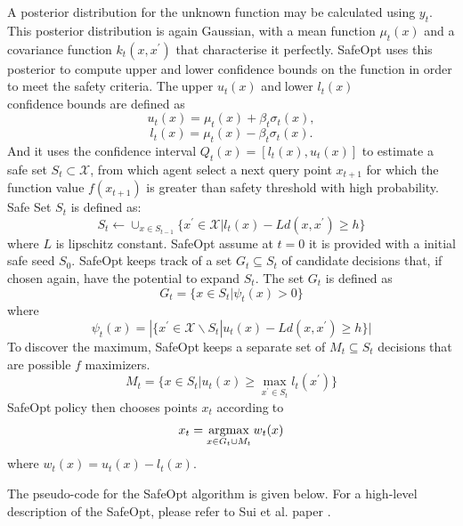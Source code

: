 A posterior distribution for the unknown function may be calculated using $y_t$.
This posterior distribution is again Gaussian, with a mean function $\mu_t(x)$ and a covariance function $k_t (x, x^\prime)$ that characterise it perfectly.
SafeOpt uses this posterior to compute upper and lower confidence bounds on the function in order to meet the safety criteria. 
The\textcolor{white}{i}upper $u_t(x)$ and\textcolor{white}{i}lower $l_t(x)$ confidence\textcolor{white}{i}bounds are defined as 
$$u_t(x)=\mu_t(x)+\beta_t\sigma_t(x),$$
$$l_t(x)=\mu_t(x)-\beta_t\sigma_t(x).$$
And it uses the confidence interval $Q_t(x) = [l_t(x), u_t(x)]$ to estimate a safe set $S_t\subset \mathcal{X}$, from which agent select a next query point $x_{t+1}$ for which the function value $f(x_{t+1})$ is greater than safety threshold with high probability. 
Safe Set $S_t$ is defined as:
$$ S_t \gets \cup_{x\in S_{t-1}}\{ x^\prime \in \mathcal{X} | l_t(x) - Ld(x,x^\prime) \geq h \} $$
where $L$ is lipschitz constant. 
SafeOpt assume at $t = 0$ it is provided with a initial safe seed $S_0$. 
SafeOpt\textcolor{white}{i}keeps track of a set $G_t \subseteq S_t$ of candidate\textcolor{white}{i}decisions that, if chosen again, have the\textcolor{white}{i}potential to\textcolor{white}{i}expand $S_t$.
The set $G_t$ is defined as
$$ G_t = \{x \in S_t | \psi_t(x) > 0 \} $$
where
$$ \psi_t(x) = |\{ x^\prime \in \mathcal{X} \backslash S_t | u_t(x) - Ld(x,x^\prime) \geq h \}| $$
To\textcolor{white}{i}discover the maximum, SafeOpt\textcolor{white}{i}keeps a separate set of $M_t \subseteq S_t$ decisions\textcolor{white}{i}that are possible $f$ maximizers.
$$ M_t = \{ x \in S_t |u_t(x) \geq \max_{x^\prime \in S_t} l_t(x^\prime) \} $$
SafeOpt\textcolor{white}{i}policy then chooses points $x_t$ according\textcolor{white}{i}to $$ x_t = \operatorname*{argmax}_{x\in G_t \cup M_t}w_t(x) $$
where $w_t(x)=u_t(x)-l_t(x)$.

The pseudo-code for the SafeOpt algorithm is given below. For a high-level description of the SafeOpt, please refer to Sui et al. paper \cite{sui15}.\\

